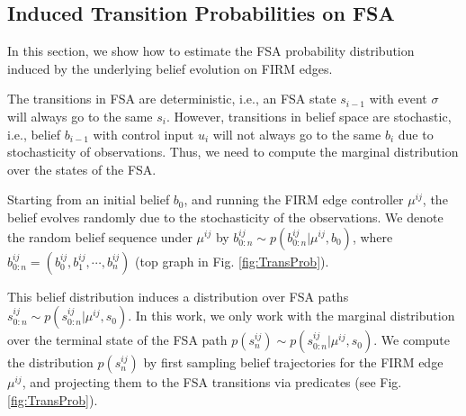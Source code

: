 \documentclass[letterpaper]{article} %
\begin{document}






\subsection{Induced Transition Probabilities on FSA}
\label{sec:TransProb}
In this section, we show how to estimate the FSA probability distribution induced by the underlying belief evolution on FIRM edges. 

The transitions in FSA are deterministic, i.e., an FSA state $s_{i-1}$ with event $\sigma$ will always go to the same $s_{i}$. However, transitions in belief space are stochastic, i.e., belief $b_{i-1}$ with control input $u_{i}$ will not always go to the same $b_{i}$ due to stochasticity of observations.
Thus, we need to compute the marginal distribution over the states of the FSA.

Starting from an initial belief $b_{0}$, and running the FIRM edge controller $\mu^{ij}$, the belief evolves randomly due to the stochasticity of the observations. We denote the random belief sequence under $\mu^{ij}$ by $b_{0:n}^{ij}\sim p(b_{0:n}^{ij}|\mu^{ij},b_0)$, where $b_{0:n}^{ij}=(b_0^{ij},b_1^{ij},\cdots,b_n^{ij})$ (top graph in Fig. \ref{fig:TransProb}).

This belief distribution induces a distribution over FSA paths $s_{0:n}^{ij}\sim p(s_{0:n}^{ij}|\mu^{ij},s_0)$. 
In this work, we only work with the marginal distribution over the terminal state of the FSA path $p(s_{n}^{ij})\sim p(s_{0:n}^{ij}|\mu^{ij},s_0)$. We compute the distribution $p(s_{n}^{ij})$ by first sampling belief trajectories for the FIRM edge $\mu^{ij}$, and projecting them to the FSA transitions via predicates (see Fig. \ref{fig:TransProb}).
\end{document}
